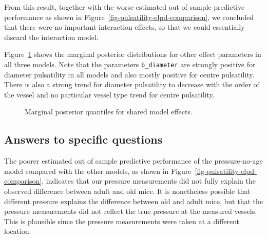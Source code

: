 \documentclass[
  letterpaper,
  DIV=11,
  numbers=noendperiod,
  oneside]{scrartcl}
\theoremstyle{plain}
\theoremstyle{remark}
\begin{document}
From this result, together with the worse estimated out of sample
predictive performance as shown in
Figure~\ref{fig-pulsatility-elpd-comparison}, we concluded that there
were no important interaction effects, so that we could essentially
discard the interaction model.

Figure~\ref{fig-pulsatility-effects} shows the marginal posterior
distributions for other effect parameters in all three models. Note that
the parameters \texttt{b\_diameter} are strongly positive for diameter
pulsatility in all models and also mostly positive for centre
pulsatility. There is also a strong trend for diameter pulsatility to
decrease with the order of the vessel and no particular vessel type
trend for centre pulsatility.

\begin{figure}


\caption{\label{fig-pulsatility-effects}Marginal posterior quantiles for
shared model effects.}

\end{figure}%

\subsection{Answers to specific
questions}\label{answers-to-specific-questions}

The poorer estimated out of sample predictive performance of the
pressure-no-age model compared with the other models, as shown in
Figure~\ref{fig-pulsatility-elpd-comparison}, indicates that our
pressure measurements did not fully explain the observed difference
between adult and old mice. It is nonetheless possible that different
pressure explains the difference between old and adult mice, but that
the pressure measurements did not reflect the true pressure at the
measured vessels. This is plausible since the pressure measurements were
taken at a different location.
\end{document}
